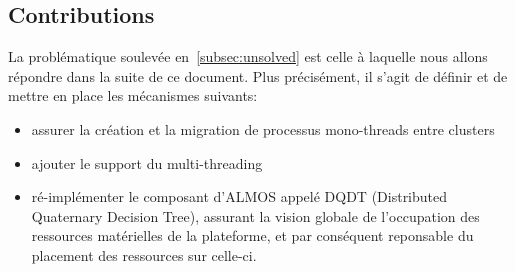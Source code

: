       
  \subsection{Contributions}

    La problématique soulevée en~\ref{subsec:unsolved} est celle à laquelle nous
    allons répondre dans la suite de ce document. Plus précisément, il s'agit de
    définir et de mettre en place les mécanismes suivants:
    
    \begin{itemize}
      \item assurer la création et la migration de processus mono-threads entre
        clusters
      \item ajouter le support du multi-threading
      \item ré-implémenter le composant d'ALMOS appelé DQDT (Distributed
        Quaternary Decision Tree), assurant la vision globale de l'occupation
        des ressources matérielles de la plateforme, et par conséquent
        reponsable du placement des ressources sur celle-ci.
    \end{itemize}

    

